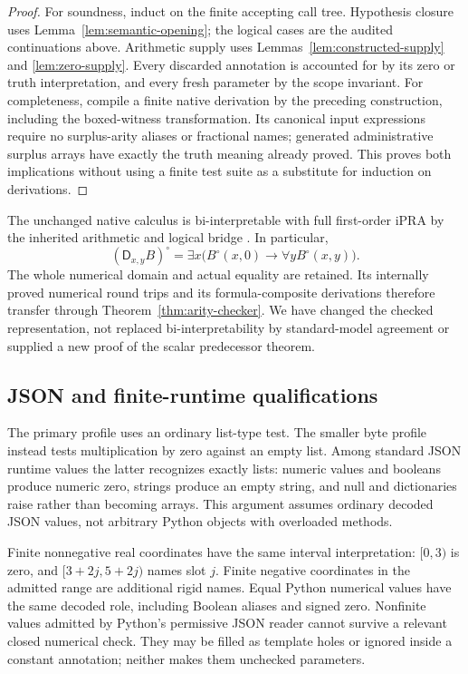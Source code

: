 \documentclass[11pt,letterpaper]{article}
\theoremstyle{definition}
\theoremstyle{remark}
\newcommand{\D}{\mathsf D}
\newcommand{\ipra}{\mathrm{iPRA}}
\begin{document}
\begin{proof}
For soundness, induct on the finite accepting call tree.  Hypothesis
closure uses Lemma~\ref{lem:semantic-opening}; the logical cases are
the audited continuations above.  Arithmetic supply uses
Lemmas~\ref{lem:constructed-supply} and \ref{lem:zero-supply}.
Every discarded annotation is accounted for by its zero or truth
interpretation, and every fresh parameter by the scope invariant.
For completeness, compile a finite native derivation by the preceding
construction, including the boxed-witness transformation.  Its
canonical input expressions require no surplus-arity aliases or fractional
names; generated administrative surplus arrays have exactly the truth
meaning already proved.  This proves both implications without using a finite test
suite as a substitute for induction on derivations.
\end{proof}

The unchanged native calculus is bi-interpretable with full first-order
$\ipra$ by the inherited arithmetic and logical bridge
\cite{generated,corpus}.  In particular,
\[
 (\D_{x,y}B)^\circ
 =\exists x\bigl(B^\circ(x,0)\to\forall yB^\circ(x,y)\bigr).
\]
The whole numerical domain and actual equality are retained.  Its
internally proved numerical round trips and its formula-composite
derivations therefore transfer through
Theorem~\ref{thm:arity-checker}.  We have changed the checked
representation, not replaced bi-interpretability by standard-model
agreement or supplied a new proof of the scalar predecessor theorem.

\subsection{JSON and finite-runtime qualifications}

The primary profile uses an ordinary list-type test.  The smaller byte
profile instead tests multiplication by zero against an empty list.
Among standard JSON runtime values the latter recognizes exactly lists:
numeric values and booleans produce numeric zero, strings produce an
empty string, and null and dictionaries raise rather than becoming
arrays.  This argument assumes ordinary decoded JSON values, not
arbitrary Python objects with overloaded methods.

Finite nonnegative real coordinates have the same interval
interpretation: $[0,3)$ is zero, and $[3+2j,5+2j)$ names slot $j$.
Finite negative coordinates in the admitted range are additional rigid
names.  Equal Python numerical values have the same decoded role,
including Boolean aliases and signed zero.  Nonfinite values admitted
by Python's permissive JSON reader cannot survive a relevant closed
numerical check.  They may be filled as template holes or ignored
inside a constant annotation; neither makes them unchecked parameters.
\end{document}
